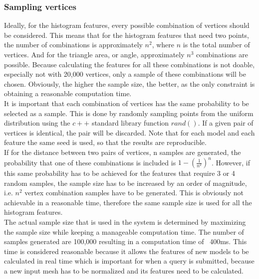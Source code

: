 \documentclass{bigdata}
\begin{document}
\subsubsection{Sampling vertices}
Ideally, for the histogram features, every possible combination of vertices should be considered. This means that for the histogram features that need two points, the number of combinations is approximately $n^2$, where $n$ is the total number of vertices. And for the triangle area, or angle, approximately $n^3$ combinations are possible. Because calculating the features for all these combinations is not doable, especially not with 20,000 vertices, only a sample of these combinations will be chosen. Obviously, the higher the sample size, the better, as the only constraint is obtaining a reasonable computation time.\\
It is important that each combination of vertices has the same probability to be selected as a sample. This is done by randomly sampling points from the uniform distribution using the $c++$ standard library function $rand()$. If a given pair of vertices is identical, the pair will be discarded. Note that for each model and each feature the same seed is used, so that the results are reproducible. \\
If for the distance between two pairs of vertices, n samples are generated, the probability that one of these combinations is included is $1-(\frac{1}{n^2})^{n}$. However, if this same probability has to be achieved for the features that require 3 or 4 random samples, the sample size has to be increased by an order of magnitude, i.e. $n^2$ vertex combination samples have to be generated. This is obviously not achievable in a reasonable time, therefore the same sample size is used for all the histogram features. \\
The actual sample size that is used in the system is determined by maximizing the sample size while keeping a manageable computation time. The number of samples generated are 100,000 resulting in a computation time of ~400ms. This time is considered reasonable because it allows the features of new models to be calculated in real time which is important for when a query is submitted, because a new input mesh has to be normalized and its features need to be calculated.
\end{document}
